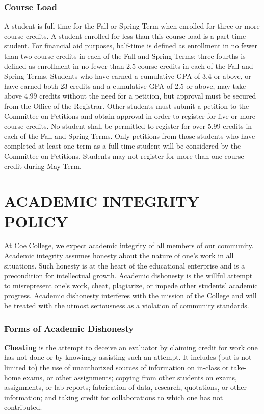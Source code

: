 \documentclass[
  letterpaper,
]{scrbook}
\begin{document}
\subsection{Course Load}\label{course-load}

A student is full-time for the Fall or Spring Term when enrolled for
three or more course credits. A student enrolled for less than this
course load is a part-time student. For financial aid purposes,
half-time is defined as enrollment in no fewer than two course credits
in each of the Fall and Spring Terms; three-fourths is defined as
enrollment in no fewer than 2.5 course credits in each of the Fall and
Spring Terms. Students who have earned a cumulative GPA of 3.4 or above,
or have earned both 23 credits and a cumulative GPA of 2.5 or above, may
take above 4.99 credits without the need for a petition, but approval
must be secured from the Office of the Registrar. Other students must
submit a petition to the Committee on Petitions and obtain approval in
order to register for five or more course credits. No student shall be
permitted to register for over 5.99 credits in each of the Fall and
Spring Terms. Only petitions from those students who have completed at
least one term as a full-time student will be considered by the
Committee on Petitions. Students may not register for more than one
course credit during May Term.

\chapter{ACADEMIC INTEGRITY POLICY}\label{academic-integrity-policy}

At Coe College, we expect academic integrity of all members of our
community. Academic integrity assumes honesty about the nature of one's
work in all situations. Such honesty is at the heart of the educational
enterprise and is a precondition for intellectual growth. Academic
dishonesty is the willful attempt to misrepresent one's work, cheat,
plagiarize, or impede other students' academic progress. Academic
dishonesty interferes with the mission of the College and will be
treated with the utmost seriousness as a violation of community
standards.

\subsection{Forms of Academic
Dishonesty}\label{forms-of-academic-dishonesty}

\textbf{Cheating} is the attempt to deceive an evaluator by claiming
credit for work one has not done or by knowingly assisting such an
attempt. It includes (but is not limited to) the use of unauthorized
sources of information on in-class or take-home exams, or other
assignments; copying from other students on exams, assignments, or lab
reports; fabrication of data, research, quotations, or other
information; and taking credit for collaborations to which one has not
contributed.
\end{document}
